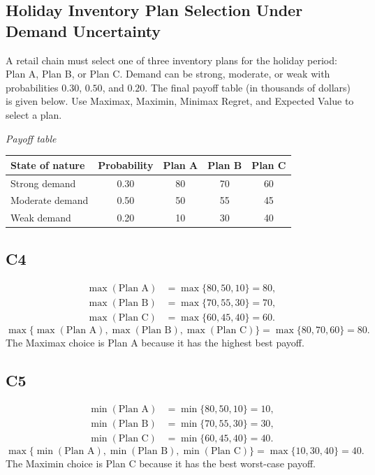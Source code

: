\begin{ExamProblems}
		\item
		\subsection*{Holiday Inventory Plan Selection Under Demand Uncertainty}
		A retail chain must select one of three inventory plans for the holiday period: Plan A, Plan B, or Plan C.
		Demand can be strong, moderate, or weak with probabilities $0.30$, $0.50$, and $0.20$. The final payoff table
		(in thousands of dollars) is given below. Use Maximax, Maximin, Minimax Regret, and Expected Value to select a plan.
		
		\begin{center}
			\textit{Payoff table} \\
			\begin{tabular}{l c c c c}
				\toprule
				State of nature & Probability & Plan A & Plan B & Plan C \\
				\midrule
				Strong demand & 0.30 & 80 & 70 & 60 \\
				Moderate demand & 0.50 & 50 & 55 & 45 \\
				Weak demand & 0.20 & 10 & 30 & 40 \\
				\bottomrule
			\end{tabular}
		\end{center}
		
		\subsection*{C4}
		\[
		\begin{aligned}
		\max(\text{Plan A}) &= \max\{80,50,10\} = 80,\\
		\max(\text{Plan B}) &= \max\{70,55,30\} = 70,\\
		\max(\text{Plan C}) &= \max\{60,45,40\} = 60.
		\end{aligned}
		\]
		\[
		\max\{\max(\text{Plan A}), \max(\text{Plan B}), \max(\text{Plan C})\}
		= \max\{80, 70, 60\}
		= 80.
		\]
		The Maximax choice is Plan A because it has the highest best payoff.
		
		\subsection*{C5}
		\[
		\begin{aligned}
		\min(\text{Plan A}) &= \min\{80,50,10\} = 10,\\
		\min(\text{Plan B}) &= \min\{70,55,30\} = 30,\\
		\min(\text{Plan C}) &= \min\{60,45,40\} = 40.
		\end{aligned}
		\]
		\[
		\max\{\min(\text{Plan A}), \min(\text{Plan B}), \min(\text{Plan C})\}
		= \max\{10, 30, 40\}
		= 40.
		\]
		The Maximin choice is Plan C because it has the best worst-case payoff.
		

\end{ExamProblems}
